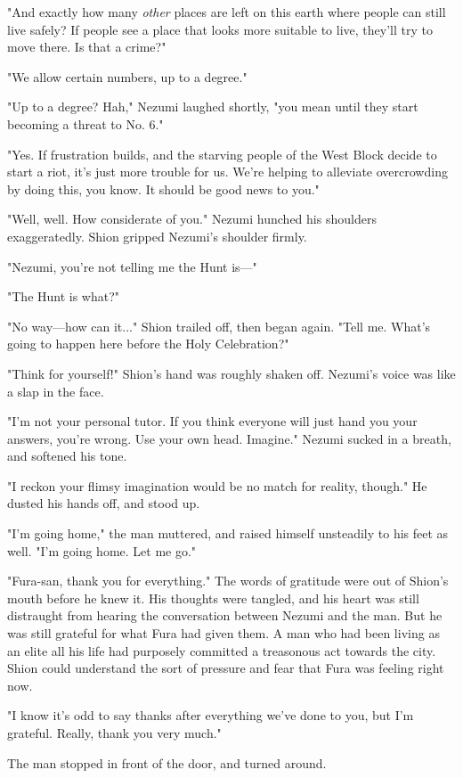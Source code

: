 "And exactly how many \emph{other} places are left on this earth where people
can still live safely? If people see a place that looks more suitable to
live, they'll try to move there. Is that a crime?"

"We allow certain numbers, up to a degree."

"Up to a degree? Hah," Nezumi laughed shortly, "you mean until they
start becoming a threat to No. 6."

"Yes. If frustration builds, and the starving people of the West Block
decide to start a riot, it's just more trouble for us. We're helping to
alleviate overcrowding by doing this, you know. It should be good news
to you."

"Well, well. How considerate of you." Nezumi hunched his shoulders
exaggeratedly. Shion gripped Nezumi's shoulder firmly.

"Nezumi, you're not telling me the Hunt is---"

"The Hunt is what?"

"No way---how can it..." Shion trailed off, then began again. "Tell me.
What's going to happen here before the Holy Celebration?"

"Think for yourself!" Shion's hand was roughly shaken off. Nezumi's
voice was like a slap in the face.

"I'm not your personal tutor. If you think everyone will just hand you
your answers, you're wrong. Use your own head. Imagine." Nezumi sucked
in a breath, and softened his tone.

"I reckon your flimsy imagination would be no match for reality,
though." He dusted his hands off, and stood up.

"I'm going home," the man muttered, and raised himself unsteadily to his
feet as well. "I'm going home. Let me go."

"Fura-san, thank you for everything." The words of gratitude were out of
Shion's mouth before he knew it. His thoughts were tangled, and his
heart was still distraught from hearing the conversation between Nezumi
and the man. But he was still grateful for what Fura had given them. A
man who had been living as an elite all his life had purposely committed
a treasonous act towards the city. Shion could understand the sort of
pressure and fear that Fura was feeling right now.

"I know it's odd to say thanks after everything we've done to you, but
I'm grateful. Really, thank you very much."

The man stopped in front of the door, and turned around.

